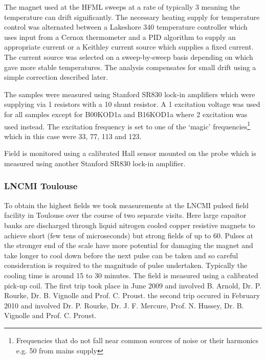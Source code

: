 The magnet used at the \ac{HFML} sweeps at a rate of typically \unit{3}{\tesla\per\minute} meaning the temperature can drift significantly. The necessary heating supply for temperature control was alternated between a Lakeshore 340 temperature controller which uses input from a Cernox thermometer and a PID algorithm to supply an appropriate current or a Keithley current source which supplies a fixed current. The current source was selected on a sweep-by-sweep basis depending on which gave more stable temperatures.  The analysis compensates for small drift using a simple correction described later. 

The samples were measured using Stanford SR830 lock-in amplifiers which were supplying via \unit{1}{\kilo\ohm} resistors with a \unit{10}{\ohm} shunt resistor. A \unit{1}{\volt} excitation voltage was used for all samples except for B00KOD1a and B16KOD1a where \unit{2}{\volt} excitation was used instead. The excitation frequency is set to one of the `magic' frequencies\footnote{Frequencies that do not fall near common sources of noise or their harmonics e.g. \unit{50}{\hertz} from mains supply} which in this case were \unit{33}{\hertz}, \unit{77}{\hertz}, \unit{113}{\hertz} and \unit{123}{\hertz}.

Field is monitored using a calibrated Hall sensor mounted on the probe which is measured using another Stanford SR830 lock-in amplifier.

\subsubsection{\ac{LNCMI} Toulouse}

To obtain the highest fields we took measurements at the \ac{LNCMI} pulsed field facility in Toulouse over the course of two separate visits. Here large capaitor banks are discharged through liquid nitrogen cooled copper resistive magnets to achieve short (few tens of microseconds) but strong fields of up to \unit{60}{\tesla}. Pulses at the stronger end of the scale have more potential for damaging the magnet and take longer to cool down before the next pulse can be taken and so careful consideration is required to the magnitude of pulse undertaken. Typically the cooling time is around 15 to 30 minutes. The field is measured using a calibrated pick-up coil. The first trip took place in June 2009 and involved B. Arnold, Dr. P. Rourke, Dr. B. Vignolle and Prof. C. Proust. the second trip occured in February 2010 and involved Dr. P. Rourke, Dr. J. F. Mercure, Prof. N. Hussey, Dr. B. Vignolle and Prof. C. Proust.

